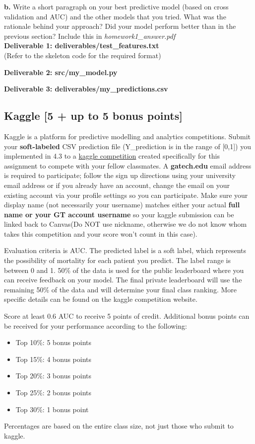 \documentclass[12pt]{article}
\begin{document}
\textbf{b.} Write a short paragraph on your best predictive model (based on cross validation and AUC) and the other models that you tried. What was the rationale behind your approach? Did your model perform better than in the previous section? Include this in \textit{homework1\_answer.pdf}\\

\textbf{Deliverable 1: deliverables/test\_features.txt}\\(Refer to the skeleton code for the required format)  

\textbf{Deliverable 2: src/my\_model.py}

\textbf{Deliverable 3: deliverables/my\_predictions.csv}


\subsection{Kaggle [5 + up to 5 bonus points]}
Kaggle is a platform for predictive modelling and analytics competitions. Submit your \textbf{soft-labeled} CSV prediction file (Y\_prediction is in the range of [0,1]) you implemented in 4.3 to a \href{https://www.kaggle.com/c/2019-fall-cse6250-bdh}{kaggle competition} created specifically for this assignment to compete with your fellow classmates. A \textbf{gatech.edu} email address is required to participate; follow the sign up directions using your university email address or if you already have an account, change the email on your existing account via your profile settings so you can participate. Make sure your display name (not necessarily your username) matches either your actual \textbf{full name or your GT account username} so your kaggle submission can be linked back to Canvas(Do NOT use nickname, otherwise we do not know whom takes this competition and your score won't count in this case).

Evaluation criteria is AUC. The predicted label is a soft label, which represents the possibility of mortality for each patient you predict. The label range is between 0 and 1. 50\% of the data is used for the public leaderboard where you can receive feedback on your model. The final private leaderboard will use the remaining 50\% of the data and will determine your final class ranking. More specific details can be found on the kaggle competition website.

Score at least 0.6 AUC to receive 5 points of credit. Additional bonus points can be received for your performance according to the following:

\begin{itemize}
\item Top 10\%: 5 bonus points
\item Top 15\%: 4 bonus points
\item Top 20\%: 3 bonus points
\item Top 25\%: 2 bonus points
\item Top 30\%: 1 bonus point
\end{itemize}
Percentages are based on the entire class size, not just those who submit to kaggle.
\end{document}
